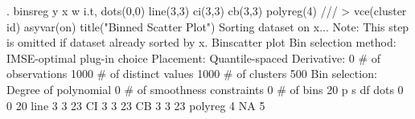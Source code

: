 . binsreg y x w i.t, dots(0,0) line(3,3) ci(3,3) cb(3,3) polyreg(4) ///
>                    vce(cluster id) asyvar(on) title("Binned Scatter Plot") 
Sorting dataset on x...
Note: This step is omitted if dataset already sorted by x.
{\smallskip}
Binscatter plot
Bin selection method: IMSE-optimal plug-in choice
Placement: Quantile-spaced
Derivative: 0
{\smallskip}
\# of observations             {\VBAR}    1000
\# of distinct values          {\VBAR}    1000
\# of clusters                 {\VBAR}     500
Bin selection:                {\VBAR} 
         Degree of polynomial {\VBAR}       0
  \# of smoothness constraints {\VBAR}       0
                    \# of bins {\VBAR}      20
{\smallskip}
         {\VBAR}      p       s       df
 dots    {\VBAR}      0       0       20
 line    {\VBAR}      3       3       23
 CI      {\VBAR}      3       3       23
 CB      {\VBAR}      3       3       23
 polyreg {\VBAR}      4       NA      5
